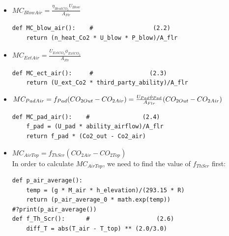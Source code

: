 \documentclass[a4paper]{article}
\numberwithin{equation}{section}
\begin{document}
\begin{itemize}
\item $MC_{BlowAir} = \frac{\eta_{HeatCO_2}U_{Blow}}{A_{Flr}}$

\begin{mdframed}[leftline=false,rightline=false,backgroundcolor=cyan!10]
  \begin{verbatim}
def MC_blow_air():    #                 (2.2)
    return (n_heat_Co2 * U_blow * P_blow)/A_flr   
  \end{verbatim}
\end{mdframed}
\item $ MC_{ExtAir} = \frac{U_{ExtCO_2}\phi_{ExtCO_2}}{A_{Flr}}$
\begin{mdframed}[leftline=false,rightline=false,backgroundcolor=cyan!10]
  \begin{verbatim}
def MC_ect_air():     #                (2.3)
    return (U_ext_Co2 * third_party_ability)/A_flr
  \end{verbatim}
\end{mdframed}
\item $ MC_{PadAir} = f_{Pad} (CO_{2 Out} - CO_{2 Air}) \\\\
     = \frac{U_{Pad} \phi_{Pad}}{A_{Flr}} (CO_{2 Out} - CO_{2 Air})$
\begin{mdframed}[leftline=false,rightline=false,backgroundcolor=cyan!10]
  \begin{verbatim}
def MC_pad_air():    #               (2.4)
    f_pad = (U_pad * ability_airflow)/A_flr
    return f_pad * (Co2_out - Co2_air)            
  \end{verbatim}
\end{mdframed}
\item $   MC_{AirTop} = f_{ThScr} (CO_{2 Air} - CO_{2 Top})$\\
In order to calculate $MC_{AirTop}$, we need to find the value of $f_{ThScr}$ first:
\begin{mdframed}[leftline=false,rightline=false,backgroundcolor=cyan!10]
  \begin{verbatim}
def p_air_average():
    temp = (g * M_air * h_elevation)/(293.15 * R)
    return (p_air_average_0 * math.exp(temp))
#?print(p_air_average())
def f_Th_Scr():      #                   (2.6)
    diff_T = abs(T_air - T_top) ** (2.0/3.0)

\end{verbatim}
\end{mdframed}
\end{itemize}
\end{document}
